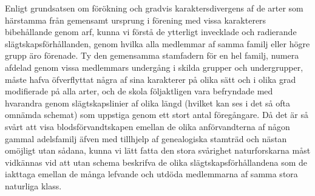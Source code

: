 Enligt grundsatsen om förökning och gradvis karaktersdivergens af de arter som härstamma från gemensamt ursprung i förening med vissa karakterers bibehållande genom arf, kunna vi förstå de ytterligt invecklade och radierande slägtskapsförhållanden, genom hvilka alla medlemmar af samma familj eller högre grupp äro förenade. Ty den gemensamma stamfadern för en hel familj, numera afdelad genom vissa medlemmars undergång i skilda grupper och undergrupper, måste hafva öfverflyttat några af sina karakterer på olika sätt och i olika grad modifierade på alla arter, och de skola följaktligen vara befryndade med hvarandra genom slägtskapslinier af olika längd (hvilket kan ses i det så ofta omnämda schemat) som uppstiga genom ett stort antal föregångare. Då det är så svårt att visa blodsförvandtskapen emellan de olika anförvandterna af någon gammal adelsfamilj äfven med tillhjelp af genealogiska stamträd och nästan omöjligt utan sådana, kunna vi lätt fatta den stora svårighet naturforskarna måst vidkännas vid att utan schema beskrifva de olika slägtskapsförhållandena som de iakttaga emellan de många lefvande och utdöda medlemmarna af samma stora naturliga klass.

